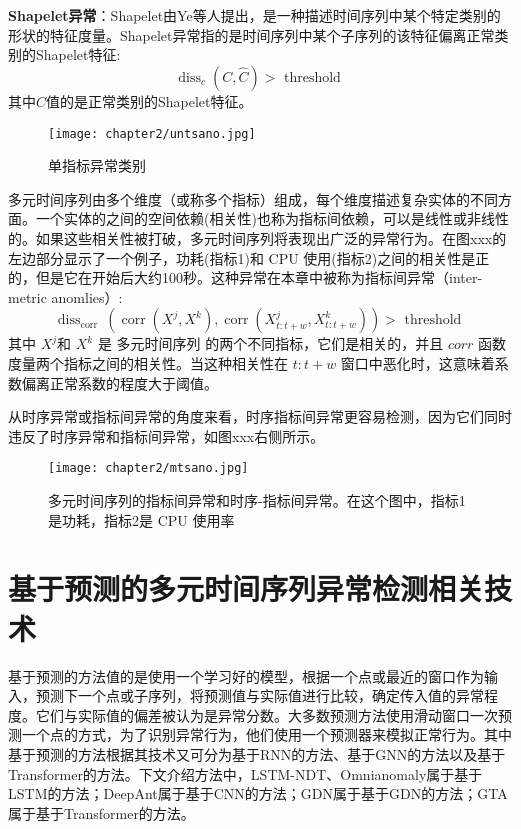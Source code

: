\textbf{Shapelet异常}：Shapelet由Ye等人\cite{shapelet}提出，是一种描述时间序列中某个特定类别的形状的特征度量。Shapelet异常指的是时间序列中某个子序列的该特征偏离正常类别的Shapelet特征:
\begin{equation}
    \operatorname{diss}_c(C, \hat{C})>\text { threshold }
    \end{equation}
其中$\hat{C}$值的是正常类别的Shapelet特征。
\begin{figure}[htb]
    \centering
    \texttt{[image: chapter2/untsano.jpg]}
    \caption{单指标异常类别}
    \end{figure}
多元时间序列由多个维度（或称多个指标）组成，每个维度描述复杂实体的不同方面。一个实体的之间的空间依赖(相关性)也称为指标间依赖，可以是线性或非线性的。如果这些相关性被打破，多元时间序列将表现出广泛的异常行为。在图xxx的左边部分显示了一个例子，功耗(指标1)和 CPU 使用(指标2)之间的相关性是正的，但是它在开始后大约100秒。这种异常在本章中被称为指标间异常（inter-metric anomlies）:
\begin{equation}
    \operatorname{diss}_{\text {corr }}\left(\operatorname{corr}\left(X^j, X^k\right), \operatorname{corr}\left(X_{t: t+w}^j, X_{t: t+w}^k\right)\right)>\text { threshold }
    \end{equation}
其中 $X^j$和 $X^k$ 是 多元时间序列 的两个不同指标，它们是相关的，并且 $corr$ 函数度量两个指标之间的相关性。当这种相关性在 $t: t + w$ 窗口中恶化时，这意味着系数偏离正常系数的程度大于阈值。

从时序异常或指标间异常的角度来看，时序指标间异常更容易检测，因为它们同时违反了时序异常和指标间异常，如图xxx右侧所示。
\begin{figure}[ht]
    \centering
    \texttt{[image: chapter2/mtsano.jpg]}
    \centering
    \caption{多元时间序列的指标间异常和时序-指标间异常。在这个图中，指标1是功耗，指标2是 CPU 使用率\cite{aiops2022}}
    \end{figure}

\section{基于预测的多元时间序列异常检测相关技术}
基于预测的方法值的是使用一个学习好的模型，根据一个点或最近的窗口作为输入，预测下一个点或子序列，将预测值与实际值进行比较，确定传入值的异常程度。它们与实际值的偏差被认为是异常分数。大多数预测方法使用滑动窗口一次预测一个点的方式，为了识别异常行为，他们使用一个预测器来模拟正常行为。其中基于预测的方法根据其技术又可分为基于RNN的方法、基于GNN的方法以及基于Transformer的方法。下文介绍方法中，LSTM-NDT、Omnianomaly属于基于LSTM的方法；DeepAnt属于基于CNN的方法；GDN属于基于GDN的方法；GTA属于基于Transformer的方法。

